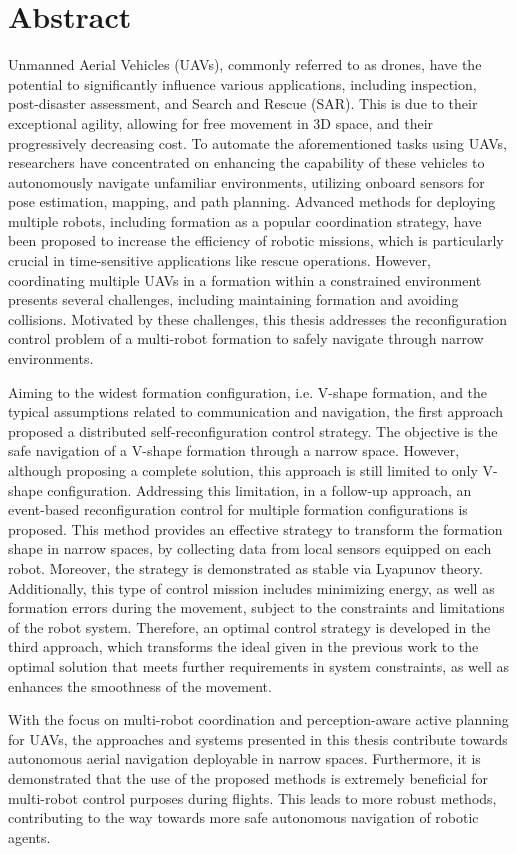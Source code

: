 \chapter*{Abstract}

Unmanned Aerial Vehicles (UAVs), commonly referred to as drones, have the potential to significantly influence various applications, including inspection, post-disaster assessment, and Search and Rescue (SAR). This is due to their exceptional agility, allowing for free movement in 3D space, and their progressively decreasing cost. To automate the aforementioned tasks using UAVs, researchers have concentrated on enhancing the capability of these vehicles to autonomously navigate unfamiliar environments, utilizing onboard sensors for pose estimation, mapping, and path planning. Advanced methods for deploying multiple robots, including formation as a popular coordination strategy, have been proposed to increase the efficiency of robotic missions, which is particularly crucial in time-sensitive applications like rescue operations. However, coordinating multiple UAVs in a formation within a constrained environment presents several challenges, including maintaining formation and avoiding collisions. Motivated by these challenges, this thesis addresses the reconfiguration control problem of a multi-robot formation to safely navigate through narrow environments.

Aiming to the widest formation configuration, i.e. V-shape formation, and the typical assumptions related to communication and navigation, the first approach proposed a distributed self-reconfiguration control strategy. The objective is the safe navigation of a V-shape formation through a narrow space. However, although proposing a complete solution, this approach is still limited to only V-shape configuration. Addressing this limitation, in a follow-up approach, an event-based reconfiguration control for multiple formation configurations is proposed. This method provides an effective strategy to transform the formation shape in narrow spaces, by collecting data from local sensors equipped on each robot. Moreover, the strategy is demonstrated as stable via Lyapunov theory. Additionally, this type of control mission includes minimizing energy, as well as formation errors during the movement, subject to the constraints and limitations of the robot system. Therefore, an optimal control strategy is developed in the third approach, which transforms the ideal given in the previous work to the optimal solution that meets further requirements in system constraints, as well as enhances the smoothness of the movement.

With the focus on multi-robot coordination and perception-aware active planning for UAVs, the approaches and systems presented in this thesis contribute towards autonomous aerial navigation deployable in narrow spaces. Furthermore, it is demonstrated that the use of the proposed methods is extremely beneficial for multi-robot control purposes during flights. This leads to more robust methods, contributing to the way towards more safe autonomous navigation of robotic agents.